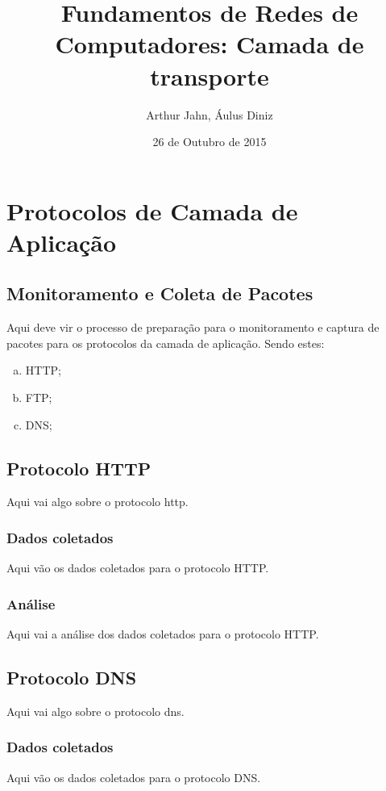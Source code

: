 \documentclass[a4paper]{report} %
\title{Fundamentos de Redes de Computadores: Camada de transporte}
\author{Arthur Jahn, Áulus Diniz}
\date{26 de Outubro de 2015}    %
\begin{document}
\maketitle  %

\tableofcontents %
\chapter{Protocolos de Camada de Aplicação}
\label{chap_primeiro} %

\section{Monitoramento e Coleta de Pacotes}
\label{sec_primeiro_monitoramento}

Aqui deve vir o processo de preparação para o monitoramento e captura de pacotes para os protocolos da camada
de aplicação. Sendo estes:  
\begin{enumerate}[a)]
 \item HTTP;
 \item FTP;
 \item DNS;
\end{enumerate}

\section{Protocolo HTTP}
\label{sec_http}
Aqui vai algo sobre o protocolo http.
\subsection{Dados coletados}
\label{sub_http_dados}
Aqui vão os dados coletados para o protocolo HTTP.

\subsection{Análise}
\label{sub_http_analise}
Aqui vai a análise dos dados coletados para o protocolo HTTP.

\section{Protocolo DNS}
\label{sec_dns}
Aqui vai algo sobre o protocolo dns.
\subsection{Dados coletados}
\label{sub_dns_dados}
Aqui vão os dados coletados para o protocolo DNS.
\end{document}

